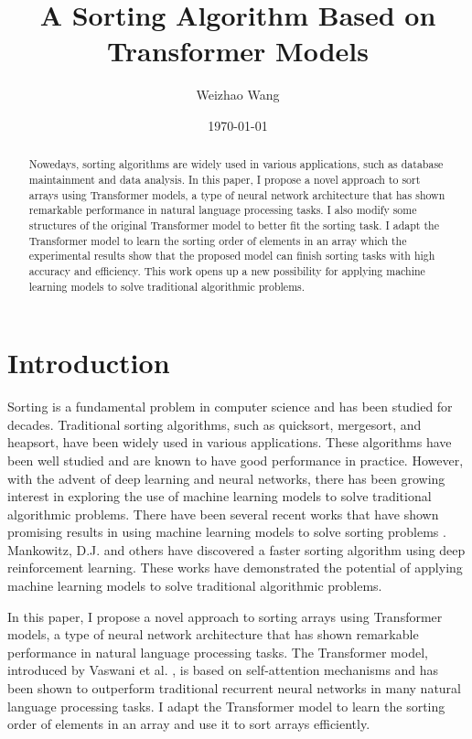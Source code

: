 \documentclass{article}
\author{Weizhao Wang}
\date{\today}
\begin{document}
\title{A Sorting Algorithm Based on Transformer Models}

\maketitle

\begin{abstract}
    Nowedays, sorting algorithms are widely used in various applications, such as database maintainment and data analysis. In this paper, I propose a novel approach to sort arrays using Transformer models, a type of neural network architecture that has shown remarkable performance in natural language processing tasks. I also modify some structures of the original Transformer model to better fit the sorting task. I adapt the Transformer model to learn the sorting order of elements in an array which the experimental results show that the proposed model can finish sorting tasks with high accuracy and efficiency. This work opens up a new possibility for applying machine learning models to solve traditional algorithmic problems.
\end{abstract}

\section{Introduction}
Sorting is a fundamental problem in computer science and has been studied for decades. Traditional sorting algorithms, such as quicksort, mergesort, and heapsort, have been widely used in various applications. These algorithms have been well studied and are known to have good performance in practice. However, with the advent of deep learning and neural networks, there has been growing interest in exploring the use of machine learning models to solve traditional algorithmic problems. There have been several recent works that have shown promising results in using machine learning models to solve sorting problems \cite{SortNet}. Mankowitz, D.J. and others \cite{FasterSorting} have discovered a faster sorting algorithm using deep reinforcement learning. These works have demonstrated the potential of applying machine learning models to solve traditional algorithmic problems.

In this paper, I propose a novel approach to sorting arrays using Transformer models, a type of neural network architecture that has shown remarkable performance in natural language processing tasks. The Transformer model, introduced by Vaswani et al. \cite{vaswani2017attention}, is based on self-attention mechanisms and has been shown to outperform traditional recurrent neural networks in many natural language processing tasks. I adapt the Transformer model to learn the sorting order of elements in an array and use it to sort arrays efficiently.
\end{document}
